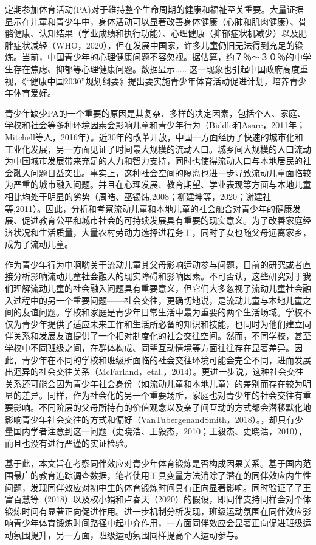 定期参加体育活动(PA)对于维持整个生命周期的健康和福祉至关重要。大量证据显示在儿童和青少年中，身体活动可以显著改善身体健康（心肺和肌肉健康）、骨骼健康、认知结果（学业成绩和执行功能）、心理健康（抑郁症状机减少）以及肥胖症状减轻（WHO，2020），但在发展中国家，许多儿童仍旧无法得到充足的锻炼。当前，中国青少年的心理健康问题不容忽视。据估算，约７％～３０％的中学生存在焦虑、抑郁等心理健康问题。数据显示......这一现象也引起中国政府高度重视，《“健康中国2030”规划纲要》提出要实施青少年体育活动促进计划，培养青少年体育爱好。

青少年缺少PA的一个重要的原因是其复杂、多样的决定因素，包括个人、家庭、学校和社会等多种环境因素会影响儿童和青少年行为（Biddle和Asare，2011年；Mitchell等人，2016年）。近30年的改革开放，中国一方面经历了快速的城市化和工业化发展，另一方面见证了时间最大规模的流动人口。城乡间大规模的人口流动为中国城市发展带来充足的人力和智力支持，同时也使得流动人口与本地居民的社会融入问题日益突出。事实上，这种社会空间的隔离也进一步导致流动儿童面临较为严重的城市融入问题。并且在心理发展、教育期望、学业表现等方面与本地儿童相比均处于明显的劣势（周皓、巫锡炜,2008；柳建坤等，2020；谢建社等,2011）。因此，分析和考察流动儿童和本地儿童的社会融合对青少年的健康发展、促进教育公平和城市社会的可持续发展具有重要的现实意义。为了改善家庭经济状况和生活质量，大量农村劳动力选择进程务工，同时子女也随父母远离家乡，成为了流动儿童。

作为青少年行为中啊哟关于流动儿童其父母影响运动参与问题，目前的研究或者直接分析影响流动儿童社会融入的现实障碍和影响因素。不可否认，这些研究对于我们理解流动儿童的社会融入问题具有重要意义，但它们大多忽视了流动儿童社会融入过程中的另一个重要问题——社会交往，更确切地说，是流动儿童与本地儿童之间的友谊问题。学校和家庭是青少年日常生活中最为重要的两个生活场域。学校不仅为青少年提供了适应未来工作和生活所必备的知识和技能，也同时为他们建立同伴关系和发展友谊提供了一个相对制度化的社会交往空间。然而，不同学校，甚至学校中不同班级之间，在群体构成、同辈互动情境等方面往往存在显著差异。因此，青少年在不同的学校和班级所面临的社会交往环境可能会完全不同，进而发展出迥异的社会交往关系（McFarland，etal.，2014）。更进一步说，这种社会交往关系还可能会因为青少年社会身份（如流动儿童和本地儿童）的差别而存在较为明显的差异。同样，作为社会化的另一个重要场所，家庭也对青少年的社会交往有重要影响。不同阶层的父母所持有的价值观念以及亲子间互动的方式都会潜移默化地影响青少年社会交往的方式和偏好（VanTubergenandSmith，2018）。，却只有少量国内学者注意到这一问题（史晓浩、王毅杰，2010；王毅杰、史晓浩，2010），而且也没有进行严谨的实证检验。

基于此，本文旨在考察同伴效应对青少年体育锻炼是否构成因果关系。基于国内范围最广的教育追踪调查数据，笔者使用工具变量方法消除了潜在的同伴效应内生性问题，发现同伴效应对初中生的体育锻炼时间具有正向显著影响。同时验证了了王富百慧等（2018）以及权小娟和卢春天（2020）的假设，即同伴支持同样会对个体锻炼时间有显著正向促进作用。进一步机制分析发现，班级运动氛围在同伴效应影响青少年体育锻炼时间路径中起中介作用，一方面同伴效应会显著正向促进班级运动氛围提升，另一方面，班级运动氛围同样提高个人运动参与。

